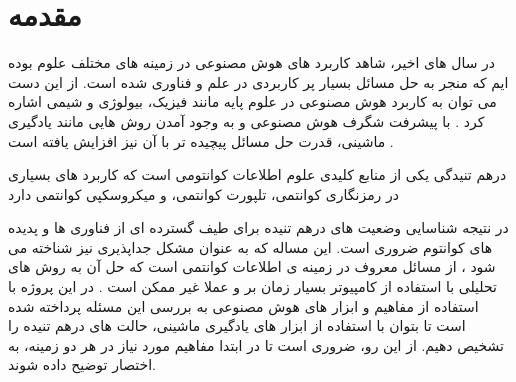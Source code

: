 \section{مقدمه}


در سال های اخیر، شاهد کاربرد های هوش مصنوعی در زمینه های مختلف علوم بوده ایم که منجر به حل مسائل بسیار پر کاربردی در علم و فناوری شده است. از این دست می توان به کاربرد هوش مصنوعی در علوم پایه مانند فیزیک، بیولوژی و شیمی اشاره کرد
\cite{Taddeo2018}.
با پیشرفت شگرف هوش مصنوعی و به وجود آمدن روش هایی مانند یادگیری ماشینی، قدرت حل مسائل پیچیده تر با آن نیز افزایش یافته است
\cite{chen2019}.

درهم تنیدگی یکی از منابع کلیدی علوم اطلاعات کوانتومی است که کاربرد های بسیاری در رمزنگاری کوانتمی، تلپورت کوانتمی، و میکروسکپی کوانتمی دارد

در نتیجه شناسایی وضعیت های درهم تنیده برای طیف گسترده ای از فناوری ها و پدیده های کوانتوم ضروری است. این مساله که به عنوان مشکل جداپذیری نیز شناخته می شود
\cite{horodecki_1996}،
از مسائل معروف در زمینه ی اطلاعات کوانتمی است که حل آن به روش های تحلیلی با استفاده از کامپیوتر بسیار زمان بر و عملا غیر ممکن است
\cite{gharibia_2010}.
در این پروژه با استفاده از مفاهیم و ابزار های هوش مصنوعی به بررسی این مسئله پرداخته شده است تا بتوان با استفاده از ابزار های یادگیری ماشینی، حالت های درهم تنیده را تشخیص دهیم.
 از این رو، ضروری است تا در ابتدا مفاهیم مورد نیاز در هر دو زمینه، به اختصار توضیح داده شوند.
